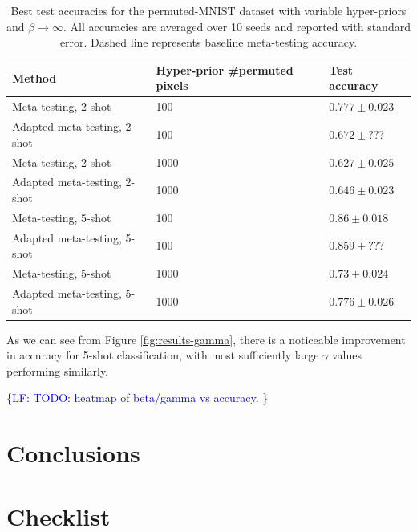 \documentclass{article}
\theoremstyle{definition}
\newcommand{\LF}[1]{\textcolor{blue}{\{LF: #1\}}}
\begin{document}
\begin{table}	
	
	\centering
	\begin{tabular}{lll}
		\toprule
		Method   & Hyper-prior \#permuted pixels  & Test accuracy   \\
		\midrule
		Meta-testing, 2-shot & 100   & $0.777\pm 0.023 $      \\
		Adapted meta-testing, 2-shot & 100   & $0.672\pm ???$      \\
		\midrule
		Meta-testing, 2-shot & 1000   & $0.627\pm 0.025 $      \\
		Adapted meta-testing, 2-shot & 1000   & $0.646\pm 0.023$      \\
		\midrule
		Meta-testing, 5-shot & 100   & $0.86\pm 0.018$      \\
		Adapted meta-testing, 5-shot & 100   & $0.859\pm ???$      \\
		\midrule
		Meta-testing, 5-shot & 1000   & $0.73\pm 0.024$      \\
		Adapted meta-testing, 5-shot & 1000   & $0.776\pm 0.026$      \\
		\bottomrule
	\end{tabular}
	\caption{Best test accuracies for the permuted-MNIST dataset with variable hyper-priors and $\beta\rightarrow \infty$. All accuracies are averaged over 10 seeds and reported with standard error. Dashed line represents baseline meta-testing accuracy.}
	\label{table:gamma}
\end{table}


As we can see from Figure \ref{fig:results-gamma}, there is a noticeable improvement in accuracy for 5-shot classification, with most sufficiently large $\gamma$ values performing similarly.


\LF{TODO: heatmap of beta/gamma vs accuracy. }

\section{Conclusions}


\clearpage



\section*{Checklist}
\end{document}
